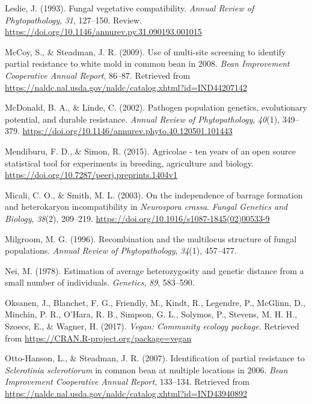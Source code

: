 \documentclass[fleqn,10pt,lineno]{wlpeerj} %
\theoremstyle{definition}
\theoremstyle{definition}
\theoremstyle{definition}
\theoremstyle{remark}
\begin{document}
\hypertarget{ref-leslie1993fungal}{}
Leslie, J. (1993). Fungal vegetative compatibility. \emph{Annual Review
of Phytopathology}, \emph{31}, 127--150. Review.
\url{https://doi.org/10.1146/annurev.py.31.090193.001015}

\hypertarget{ref-mccoy2009use}{}
McCoy, S., \& Steadman, J. R. (2009). Use of multi-site screening to
identify partial resistance to white mold in common bean in 2008.
\emph{Bean Improvement Cooperative Annual Report}, 86--87. Retrieved
from \url{https://naldc.nal.usda.gov/naldc/catalog.xhtml?id=IND44207142}

\hypertarget{ref-mcdonald2002pathogen}{}
McDonald, B. A., \& Linde, C. (2002). Pathogen population genetics,
evolutionary potential, and durable resistance. \emph{Annual Review of
Phytopathology}, \emph{40}(1), 349--379.
\url{https://doi.org/10.1146/annurev.phyto.40.120501.101443}

\hypertarget{ref-mendiburu2015agricolae}{}
Mendiburu, F. D., \& Simon, R. (2015). Agricolae - ten years of an open
source statistical tool for experiments in breeding, agriculture and
biology. \url{https://doi.org/10.7287/peerj.preprints.1404v1}

\hypertarget{ref-micali2003independence}{}
Micali, C. O., \& Smith, M. L. (2003). On the independence of barrage
formation and heterokaryon incompatibility in \emph{Neurospora crassa}.
\emph{Fungal Genetics and Biology}, \emph{38}(2), 209--219.
\url{https://doi.org/10.1016/s1087-1845(02)00533-9}

\hypertarget{ref-milgroom1996recombination}{}
Milgroom, M. G. (1996). Recombination and the multilocus structure of
fungal populations. \emph{Annual Review of Phytopathology},
\emph{34}(1), 457--477.

\hypertarget{ref-nei1978estimation}{}
Nei, M. (1978). Estimation of average heterozygosity and genetic
distance from a small number of individuals. \emph{Genetics}, \emph{89},
583--590.

\hypertarget{ref-vegan}{}
Oksanen, J., Blanchet, F. G., Friendly, M., Kindt, R., Legendre, P.,
McGlinn, D., Minchin, P. R., O'Hara, R. B., Simpson, G. L., Solymos, P.,
Stevens, M. H. H., Szoecs, E., \& Wagner, H. (2017). \emph{Vegan:
Community ecology package}. Retrieved from
\url{https://CRAN.R-project.org/package=vegan}

\hypertarget{ref-otto2007identification}{}
Otto-Hanson, L., \& Steadman, J. R. (2007). Identification of partial
resistance to \emph{Sclerotinia sclerotiorum} in common bean at multiple
locations in 2006. \emph{Bean Improvement Cooperative Annual Report},
133--134. Retrieved from
\url{https://naldc.nal.usda.gov/naldc/catalog.xhtml?id=IND43940892}
\end{document}
